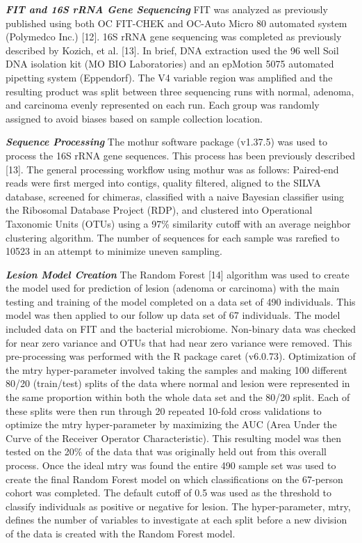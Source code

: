 \documentclass[12pt,]{article}
\begin{document}
\textbf{\emph{FIT and 16S rRNA Gene Sequencing}} FIT was analyzed as
previously published using both OC FIT-CHEK and OC-Auto Micro 80
automated system (Polymedco Inc.) {[}12{]}. 16S rRNA gene sequencing was
completed as previously described by Kozich, et al. {[}13{]}. In brief,
DNA extraction used the 96 well Soil DNA isolation kit (MO BIO
Laboratories) and an epMotion 5075 automated pipetting system
(Eppendorf). The V4 variable region was amplified and the resulting
product was split between three sequencing runs with normal, adenoma,
and carcinoma evenly represented on each run. Each group was randomly
assigned to avoid biases based on sample collection location.

\textbf{\emph{Sequence Processing}} The mothur software package
(v1.37.5) was used to process the 16S rRNA gene sequences. This process
has been previously described {[}13{]}. The general processing workflow
using mothur was as follows: Paired-end reads were first merged into
contigs, quality filtered, aligned to the SILVA database, screened for
chimeras, classified with a naive Bayesian classifier using the
Ribosomal Database Project (RDP), and clustered into Operational
Taxonomic Units (OTUs) using a 97\% similarity cutoff with an average
neighbor clustering algorithm. The number of sequences for each sample
was rarefied to 10523 in an attempt to minimize uneven sampling.

\textbf{\emph{Lesion Model Creation}} The Random Forest {[}14{]}
algorithm was used to create the model used for prediction of lesion
(adenoma or carcinoma) with the main testing and training of the model
completed on a data set of 490 individuals. This model was then applied
to our follow up data set of 67 individuals. The model included data on
FIT and the bacterial microbiome. Non-binary data was checked for near
zero variance and OTUs that had near zero variance were removed. This
pre-processing was performed with the R package caret (v6.0.73).
Optimization of the mtry hyper-parameter involved taking the samples and
making 100 different 80/20 (train/test) splits of the data where normal
and lesion were represented in the same proportion within both the whole
data set and the 80/20 split. Each of these splits were then run through
20 repeated 10-fold cross validations to optimize the mtry
hyper-parameter by maximizing the AUC (Area Under the Curve of the
Receiver Operator Characteristic). This resulting model was then tested
on the 20\% of the data that was originally held out from this overall
process. Once the ideal mtry was found the entire 490 sample set was
used to create the final Random Forest model on which classifications on
the 67-person cohort was completed. The default cutoff of 0.5 was used
as the threshold to classify individuals as positive or negative for
lesion. The hyper-parameter, mtry, defines the number of variables to
investigate at each split before a new division of the data is created
with the Random Forest model.
\end{document}
